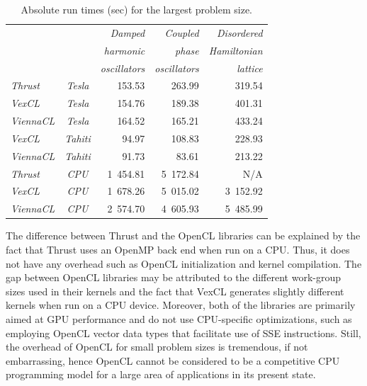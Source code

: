 \documentclass[final]{siamltex}
\begin{document}
\begin{table}
 \centering
    \caption{Absolute run times (sec) for the largest problem size.}
    \label{tab:abstimes}
    \begin{tabular}{|lc|rrr|}
        \hline
        & & \em Damped      & \em Coupled       & \em Disordered  \\ %
        & & \em harmonic    & \em phase         & \em Hamiltonian \\ %
        & & \em oscillators & \em oscillators   & \em lattice     \\ %
        \hline
        \em Thrust   &\em Tesla & 153.53 & 263.99 & 319.54 \\ %
        \em VexCL    &\em Tesla & 154.76 & 189.38 & 401.31 \\ %
        \em ViennaCL &\em Tesla & 164.52 & 165.21 & 433.24 \\ %
        \hline
        \em VexCL    &\em Tahiti &  94.97 & 108.83 & 228.93 \\ %
        \em ViennaCL &\em Tahiti &  91.73 &  83.61 & 213.22 \\ %
        \hline
        \em Thrust   &\em CPU   & 1~454.81 & 5~172.84 &      N/A \\ %
        \em VexCL    &\em CPU   & 1~678.26 & 5~015.02 & 3~152.92 \\ %
        \em ViennaCL &\em CPU   & 2~574.70 & 4~605.93 & 5~485.99 \\ %
        \hline
    \end{tabular}
\end{table}


The difference between Thrust and the OpenCL libraries can be explained by the fact
that Thrust uses an OpenMP back end when run on a CPU. Thus, it does not have any
overhead such as OpenCL initialization and kernel compilation.  The gap
between OpenCL libraries may be attributed to the different work-group sizes
used in their kernels and the fact that VexCL generates slightly different
kernels when run on a CPU device. Moreover, both of the libraries are primarily
aimed at GPU performance and do not use CPU-specific optimizations, such as
employing OpenCL vector data types that facilitate use of SSE instructions.
Still, the overhead of OpenCL for small problem sizes is tremendous, if not embarrassing,
hence OpenCL cannot be considered to be a competitive CPU programming model for a large area of applications in its present state.
\end{document}

